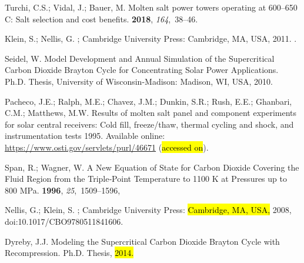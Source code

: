\documentclass[sustainability,article,accept,moreauthors,pdftex]{Definitions/mdpi}
\begin{document}
\begin{thebibliography}{999}
Turchi, C.S.; Vidal, J.; Bauer, M.
\newblock Molten salt power towers operating at 600--650 C: Salt selection and
  cost benefits.
 {\bf 2018}, {\em 164},~38--46.

Klein, S.; Nellis, G.
; Cambridge University Press: Cambridge, MA, USA, 2011.
\newblock
  {\href{https://doi.org/10.1017/CBO9780511994883}{}}.

Seidel, W.
\newblock Model Development and Annual Simulation of the Supercritical Carbon
  Dioxide Brayton Cycle for Concentrating Solar Power Applications.
\newblock Ph.D. Thesis, University of Wisconsin-Madison: Madison, WI, USA,  2010.

Pacheco, J.E.; Ralph, M.E.; Chavez, J.M.; Dunkin, S.R.; Rush, E.E.; Ghanbari,
  C.M.; Matthews, M.W.
\newblock Results of molten salt panel and component experiments for solar
  central receivers: Cold fill, freeze/thaw, thermal cycling and shock, and
  instrumentation tests {1995}. %
 Available online: \url{https://www.osti.gov/servlets/purl/46671} (\hl{accessed on}).
\newblock

Span, R.; Wagner, W.
\newblock A New Equation of State for Carbon Dioxide Covering the Fluid Region
  from the Triple‐Point Temperature to 1100 K at Pressures up to 800 MPa.
 {\bf 1996},
  {\em 25},~1509--1596,

Nellis, G.; Klein, S.
; Cambridge University Press: \hl{Cambridge, MA, USA,} %
 2008, doi:10.1017/CBO9780511841606.

Dyreby, J.J.
\newblock Modeling the Supercritical Carbon Dioxide Brayton Cycle with
  Recompression.
\newblock Ph.D. Thesis, \hl{2014.}%


\end{thebibliography}
\end{document}
